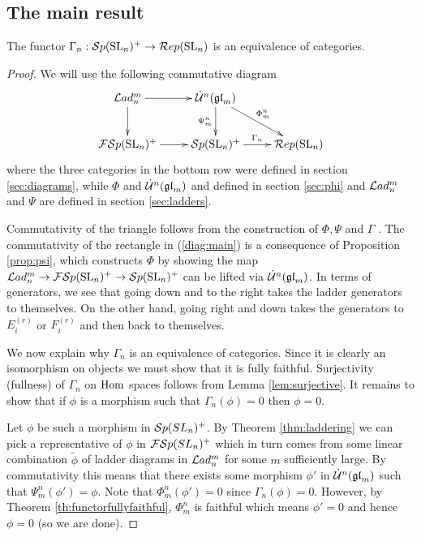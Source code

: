 \documentclass[10pt,leqno]{article}
\begin{document}
\subsection{The main result}\label{sec:main}

\begin{thm}\label{thm:main}
The functor $\Gamma_n: {\mathcal{S}p}({\rm{SL}}_n)^+ \rightarrow \mathcal{R}ep({\rm{SL}}_n)$ is an equivalence of categories. 
\end{thm}
\begin{proof}
We will use the following commutative diagram
\begin{equation}\label{diag:main}
\xymatrix{
\Lad_n^m \ar[r] \ar[d] & \dU^n(\gl_m) \ar[dr]^{\Phi_m^n} \ar[d]_{\Psi_m^n} & \\
\FSp(\SL_n)^+ \ar[r] & \Sp(\SL_n)^+ \ar[r]^{\Gamma_n} & \Rep(\SL_n) \\
}
\end{equation}
where the three categories in the bottom row were defined in section \ref{sec:diagrams}, while 
$\Phi$ and $\dot{{\mathcal{U}}}^n({\mathfrak{gl}}_m)$ and defined in section \ref{sec:phi} and $\mathcal{L}ad_n^m$ and $\Psi$ are defined in section \ref{sec:ladders}.

Commutativity of the triangle follows from the construction of $\Phi,\Psi$ and $\Gamma$ . The commutativity of the rectangle in (\ref{diag:main}) is a consequence of Proposition \ref{prop:psi}, which constructs $\Phi$ by showing the map $\mathcal{L}ad_n^m \to {\mathcal{FS}p}({\rm{SL}}_n)^+ \to {\mathcal{S}p}({\rm{SL}}_n)^+$ can be lifted via $\dot{{\mathcal{U}}}^n({\mathfrak{gl}}_m)$. In terms of generators, we see that going down and to the right takes the ladder generators to themselves. On the other hand, going right and down takes the generators to $E_i^{(r)}$ or $F_i^{(r)}$ and then back to themselves. 

We now explain why $\Gamma_n$ is an equivalence of categories. Since it is clearly an isomorphism on objects we must show that it is fully faithful. Surjectivity (fullness) of $\Gamma_n$ on $\operatorname{Hom}$ spaces follows from Lemma \ref{lem:surjective}. It remains to show that if $\phi$ is a morphism such that $\Gamma_n(\phi)=0$ then $\phi=0$. 

Let $\phi$ be such a morphism in ${\mathcal{S}p}(SL_n)^+$. By Theorem \ref{thm:laddering} we can pick a representative of $\phi$ in ${\mathcal{FS}p}(SL_n)^+$ which in turn comes from some linear combination $\tilde{\phi}$ of ladder diagrams in $\mathcal{L}ad_n^m$ for some $m$ sufficiently large. By commutativity this means that there exists some morphism $\phi'$ in $\dot{{\mathcal{U}}}^n({\mathfrak{gl}}_m)$ such that $\Psi_m^n(\phi')=\phi$. Note that $\Phi^n_m(\phi')=0$ since $\Gamma_n(\phi)=0$. However, by Theorem \ref{th:functorfullyfaithful}, $\Phi_m^n$ is faithful which means $\phi'=0$ and hence $\phi=0$ (so we are done). 

\end{proof}
\end{document}
